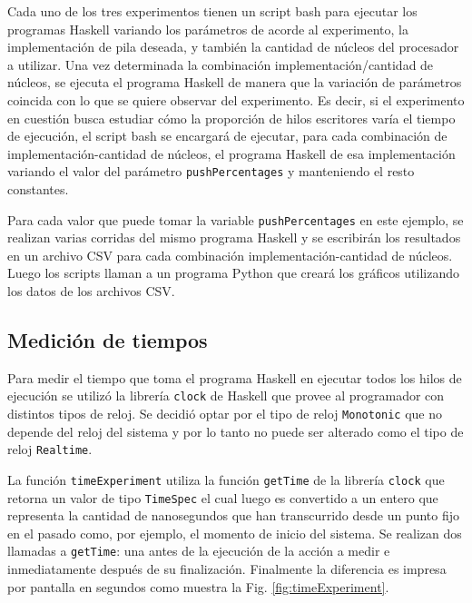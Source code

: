 
Cada uno de los tres experimentos tienen un script bash para ejecutar los programas Haskell variando los parámetros de acorde al experimento, la implementación de pila deseada, y también la cantidad de núcleos del procesador a utilizar.
Una vez determinada la combinación implementación/cantidad de núcleos, se ejecuta el programa Haskell de manera que la variación de parámetros coincida con lo que se quiere observar del experimento.
Es decir, si el experimento en cuestión busca estudiar cómo la proporción de hilos escritores varía el tiempo de ejecución, el script bash se encargará de ejecutar, para cada combinación de implementación-cantidad de núcleos, el programa Haskell de esa implementación variando el valor del parámetro \texttt{pushPercentages} y manteniendo el resto constantes.

Para cada valor que puede tomar la variable \texttt{pushPercentages} en este ejemplo, se realizan varias corridas del mismo programa Haskell y se escribirán los resultados en un archivo CSV para cada combinación implementación-cantidad de núcleos.
Luego los scripts llaman a un programa Python que creará los gráficos utilizando los datos de los archivos CSV.

\subsection{Medición de tiempos}\label{time-measuring}
Para medir el tiempo que toma el programa Haskell en ejecutar todos los hilos de ejecución se utilizó la librería \texttt{clock} \cite{timeMeasuring} de Haskell que provee al programador con distintos tipos de reloj. Se decidió optar por el tipo de reloj \texttt{Monotonic} que no depende del reloj del sistema y por lo tanto no puede ser alterado como el tipo de reloj \texttt{Realtime}.

La función \texttt{timeExperiment} utiliza la función \texttt{getTime} de la librería \texttt{clock} que retorna un valor de tipo \texttt{TimeSpec} el cual luego es convertido a un entero que representa la cantidad de nanosegundos que han transcurrido desde un punto fijo en el pasado como, por ejemplo, el momento de inicio del sistema.
Se realizan dos llamadas a \texttt{getTime}: una antes de la ejecución de la acción a medir e inmediatamente después de su finalización. Finalmente la diferencia es impresa por pantalla en segundos como muestra la Fig. \ref{fig:timeExperiment}.

